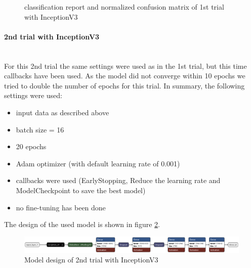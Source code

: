 \documentclass{article}
\begin{document}
\begin{figure}[ht]
  \centering
  \qquad
  \caption{classification report and normalized confusion matrix of 1st trial with InceptionV3}
  \label{fig:inceptionv3_04_results}
\end{figure}



\paragraph{2nd trial with InceptionV3}\mbox{}\\
For this 2nd trial the same settings were used as in the 1st trial, but this time callbacks have been used. As the model did not converge within 10 epochs we tried to double the number of epochs for this trial. In summary, the following settings were used: 
\begin{itemize}
\item input data as described above
\item batch size = 16
\item 20 epochs 
\item Adam optimizer (with default learning rate of 0.001)
\item callbacks were used (EarlyStopping, Reduce the learning rate and ModelCheckpoint to save the best model)
\item no fine-tuning has been done
\end{itemize}

The design of the used model is shown in figure \ref{fig:inceptionv3_05.keras_model_design}.
\begin{figure}[htb] %
    \centering
    \includegraphics[width=1.0\linewidth]{inceptionv3_05.keras_model_design_nice.png}
    \caption{Model design of 2nd trial with InceptionV3}
    \label{fig:inceptionv3_05.keras_model_design}
\end{figure}
\end{document}
